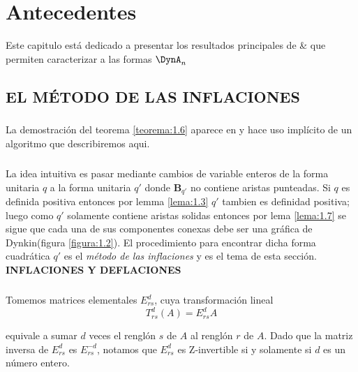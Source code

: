 \chapter{Antecedentes}
\begin{center}
Este capitulo está dedicado a presentar los resultados principales de \citep{alma991031505829703276} \& \citep{Barot1999ACO} que permiten caracterizar a las formas $\DynA_{n}$
\end{center}

\section{EL MÉTODO DE LAS INFLACIONES}\label{sec:2.1}

\paragraph{}
La demostración del teorema \ref{teorema:1.6} aparece en \citep{alma991031505829703276} y hace uso implícito de un algoritmo que describiremos aqui.

\paragraph{}
La idea intuitiva es pasar mediante cambios de variable enteros de la forma unitaria $q$ a la forma unitaria $q'$ donde $\textbf{B}_{q'}$ no contiene aristas punteadas. Si $q$ es definida positiva entonces por lemma \ref{lema:1.3} $q'$ tambien es definidad positiva; luego como $q'$ solamente contiene aristas solidas entonces por lema \ref{lema:1.7} se sigue que cada una de sus componentes conexas debe ser una gráfica de Dynkin(figura \ref{figura:1.2}). El procedimiento para encontrar dicha forma cuadrática $q'$ es el \textit{método de las inflaciones} y es el tema de esta sección.\\

\textbf{INFLACIONES Y DEFLACIONES}

\paragraph{}
Tomemos matrices elementales $E_{rs}^{d}$, cuya transformación lineal 
\begin{equation*}
    T_{rs}^{d}\left(A\right) = E_{rs}^{d}A
\end{equation*}

equivale a sumar $d$ veces el renglón $s$ de $A$ al renglón $r$ de $A$. Dado que la matriz inversa de $E_{rs}^{d}$ es $E_{rs}^{-d}$, notamos que $E_{rs}^{d}$ es $\mathrm{Z}$-invertible si y solamente si $d$ es un número entero.

